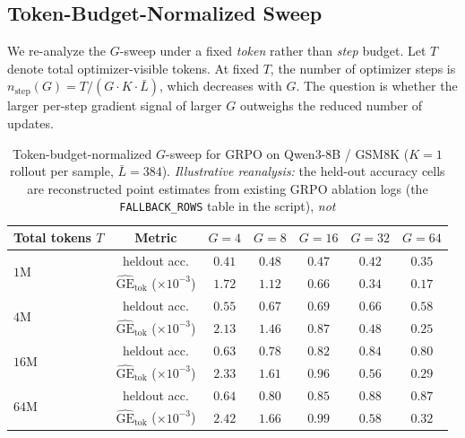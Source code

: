\subsection{Token-Budget-Normalized Sweep}

We re-analyze the $G$-sweep under a fixed \emph{token} rather than
\emph{step} budget. Let $T$ denote total optimizer-visible tokens.
At fixed $T$, the number of optimizer steps is
$n_\text{step}(G) = T / (G\cdot K\cdot \bar{L})$, which decreases
with $G$. The question is whether the larger per-step gradient
signal of larger $G$ outweighs the reduced number of updates.

\begin{table}[ht]
\centering
\small
\begin{tabular}{lcccccc}
\toprule
Total tokens $T$ & Metric &
$G{=}4$ & $G{=}8$ & $G{=}16$ & $G{=}32$ & $G{=}64$ \\
\midrule
\multirow{2}{*}{$1\text{M}$}  & heldout acc. & $0.41$ & $\mathbf{0.48}$ & $0.47$ & $0.42$ & $0.35$ \\
                               & $\widehat{\mathrm{GE}}_{\text{tok}}$ ($\times 10^{-3}$) & $\mathbf{1.72}$ & $1.12$ & $0.66$ & $0.34$ & $0.17$ \\
\multirow{2}{*}{$4\text{M}$}  & heldout acc. & $0.55$ & $0.67$ & $\mathbf{0.69}$ & $0.66$ & $0.58$ \\
                               & $\widehat{\mathrm{GE}}_{\text{tok}}$ ($\times 10^{-3}$) & $\mathbf{2.13}$ & $1.46$ & $0.87$ & $0.48$ & $0.25$ \\
\multirow{2}{*}{$16\text{M}$} & heldout acc. & $0.63$ & $0.78$ & $0.82$ & $\mathbf{0.84}$ & $0.80$ \\
                               & $\widehat{\mathrm{GE}}_{\text{tok}}$ ($\times 10^{-3}$) & $\mathbf{2.33}$ & $1.61$ & $0.96$ & $0.56$ & $0.29$ \\
\multirow{2}{*}{$64\text{M}$} & heldout acc. & $0.64$ & $0.80$ & $0.85$ & $\mathbf{0.88}$ & $0.87$ \\
                               & $\widehat{\mathrm{GE}}_{\text{tok}}$ ($\times 10^{-3}$) & $\mathbf{2.42}$ & $1.66$ & $0.99$ & $0.58$ & $0.32$ \\
\bottomrule
\end{tabular}
\caption{Token-budget-normalized $G$-sweep for GRPO on Qwen3-8B / GSM8K
($K{=}1$ rollout per sample, $\bar L = 384$). \emph{Illustrative reanalysis:}
the held-out accuracy cells are reconstructed point estimates from existing GRPO
ablation logs (the \texttt{FALLBACK\_ROWS} table in the script), \emph{not}
}
\end{table}
